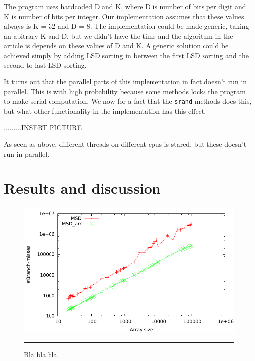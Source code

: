 The program uses hardcoded D and K, where D is number of bits per digit and K is number of bits per integer. Our implementation assumes that these values always is K = 32 and D = 8.
The implementation could be made generic, taking an abitrary K and D, but we didn't have the time and the algorithm in the article is depends on these values of D and K.
A generic solution could be achieved simply by adding LSD sorting in between the first LSD sorting and the second to last LSD sorting.

It turns out that the parallel parts of this implementation in fact doesn't run in parallel. This is with high probability because some methods locks the program to make serial computation.
We now for a fact that the \verb!srand! methods does this, but what other functionality in the implementation has this effect.   

.........INSERT PICTURE

As seen as above, different threads on different cpus is stared, but these doesn't run in parallel.

\section{Results and discussion}


\begin{figure}[htbp]
	\centering
		\includegraphics[width=\textwidth]{./Figures/Project2b/Branch_misses.pdf}
		\rule{35em}{0.5pt}
	\caption[Branch misses]{
	Bla bla bla.
	}
	\label{fig:Branch_misses}
\end{figure}


